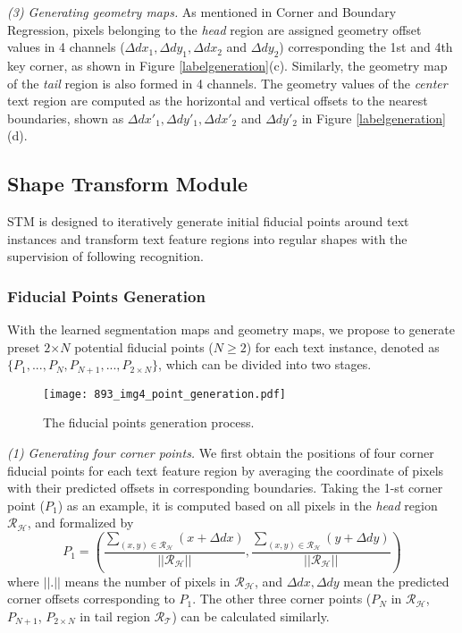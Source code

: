 \documentclass[letterpaper]{article} \usepackage{aaai20}  \usepackage{times}  \usepackage{helvet} \usepackage{courier}  \usepackage[hyphens]{url}  \usepackage{graphicx} \urlstyle{rm} \def\UrlFont{\rm}  \usepackage{graphicx}  \frenchspacing  \setlength{\pdfpagewidth}{8.5in}  \setlength{\pdfpageheight}{11in}  \usepackage{amsmath}
\begin{document}
\emph{(3) Generating geometry maps.}
As mentioned in  Corner and Boundary Regression, pixels belonging to the \emph{head} region are assigned geometry offset values in 4 channels ($\Delta dx_1, \Delta dy_1, \Delta dx_2$ and $\Delta dy_2$) corresponding the 1st and 4th key corner, as shown in Figure \ref{labelgeneration}(c).
Similarly, the geometry map of the \emph{tail} region is also formed in 4 channels.
The geometry values of the \emph{center} text region are computed as the horizontal and vertical offsets to the nearest boundaries, shown as $\Delta dx'_1, \Delta dy'_1, \Delta dx'_2$ and $\Delta dy'_2$ in Figure \ref{labelgeneration}(d).

\subsection{Shape Transform Module}
STM is designed to iteratively generate initial fiducial points around text instances and transform text feature regions into regular shapes with the supervision of following recognition.
\subsubsection{Fiducial Points Generation}
With the learned segmentation maps and geometry maps, we propose to generate preset $2$$\times$$N$ potential fiducial points ($N$$\ge$$2$) for each text instance, denoted as $\{P_1,...,P_N, P_{N+1},...,P_{2\times N}\}$, which can be divided into two stages.
\begin{figure}
\centering
\texttt{[image: 893\_img4\_point\_generation.pdf]}\\
\caption{The fiducial points generation process.}
\label{fig:fiducial-points}
\end{figure}

\emph{(1) Generating four corner points.}
We first obtain the positions of four corner fiducial points for each text feature region by averaging the coordinate of pixels with their predicted offsets in corresponding boundaries.
Taking the 1-st corner point ($P_1$) as an example, it is computed based on all pixels in the \emph{head} region $\mathcal{R}_\mathcal{H}$, and formalized by
\begin{equation}
P_1  = \left(\frac{\sum_{(x,y) \in \mathcal{R}_\mathcal{H}} (x + \Delta dx)}{||\mathcal{R}_\mathcal{H}||}, \frac{\sum_{(x,y) \in \mathcal{R}_\mathcal{H}} (y + \Delta dy)}{||\mathcal{R}_\mathcal{H}||}\right)
\end{equation}
where $||.||$ means the number of pixels in $\mathcal{R}_\mathcal{H}$, and $\Delta dx,\Delta dy$ mean the predicted corner offsets corresponding to ${P}_1$.
The other three corner points ($P_N$ in $\mathcal{R}_\mathcal{H}$, $P_{N+1}$, $P_{2\times N}$ in tail region $\mathcal{R}_\mathcal{T}$) can be calculated similarly.
\end{document}
